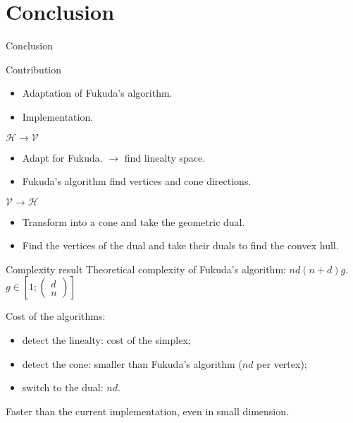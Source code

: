 \section{Conclusion}
\begin{frame}{Conclusion}
\begin{block}{Contribution}
\begin{itemize}
\item Adaptation of Fukuda's algorithm.
\item Implementation.
\end{itemize}
\end{block}

\begin{block}{$\mathcal{H}\rightarrow\mathcal{V}$}
\begin{itemize}
\item Adapt for Fukuda. $\rightarrow$ find linealty space.
\item Fukuda's algorithm find vertices and cone directions.
\end{itemize}
\end{block}


\begin{block}{$\mathcal{V}\rightarrow\mathcal{H}$}
\begin{itemize}
\item Transform into a cone and take the geometric dual.
\item Find the vertices of the dual and take their duals to find the convex hull.
\end{itemize}
\end{block}
\end{frame}


\begin{frame}{Complexity result}
Theoretical complexity of Fukuda's algorithm: $nd(n+d)g$. $g\in \left[1;
\begin{pmatrix}
 d\\
 n 
 \end{pmatrix}\right]$

Cost of the algorithms:
\begin{itemize}
\item detect the linealty: cost of the simplex;
\item detect the cone: smaller than Fukuda's algorithm ($nd$ per vertex);
\item switch to the dual: $nd$.
\end{itemize} 

Faster than the current implementation, even in small dimension.

\end{frame}



